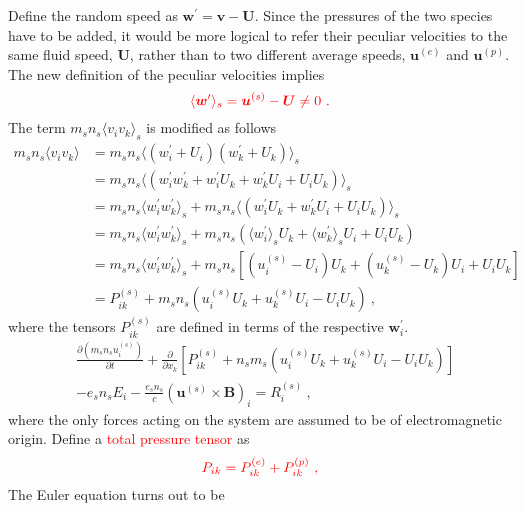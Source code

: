 \documentclass[12pt,a4paper]{article}
\renewcommand{\vec}[1]{\boldsymbol{#1}}
\begin{document}
Define the random speed as $\vec{w}^\prime = \vec{v} - \vec{U}$. Since the pressures of the two species have to be added, it would be more logical to refer their peculiar velocities to the same fluid speed, $\vec{U}$, rather than to two different average speeds, $\vec{u}^{(e)}$ and $\vec{u}^{(p)}$. The new definition of the peculiar velocities implies
\begin{equation*}
\color{red} \langle \vec{w}^\prime \rangle_s = \vec{u}^{(s)} - \vec{U} \neq 0 ~.
\end{equation*}
The term $m_s n_s \langle v_i v_k \rangle_s$ is modified as follows
\begin{align*}
m_s n_s \langle v_i v_k \rangle & = m_s n_s \langle (w_i^\prime +U_i)(w_k^\prime +U_k) \rangle_s \\
&  \boxed{= m_s n_s  \langle (w_i^\prime w_k^\prime +w_i^\prime U_k +w_k^\prime U_i +U_i U_k) \rangle_s }\\
&  \boxed{= m_s n_s  \langle w_i^\prime w_k^\prime \rangle_s +m_s n_s \langle (w_i^\prime U_k +w_k^\prime U_i +U_i U_k) \rangle_s }\\
&  \boxed{= m_s n_s  \langle w_i^\prime w_k^\prime \rangle_s +m_s n_s (\langle w_i^\prime \rangle_s U_k + \langle w_k^\prime \rangle_s U_i +U_i U_k ) }\\
& \boxed{= m_s n_s  \langle w_i^\prime w_k^\prime \rangle_s +m_s n_s \left[ \left(u^{(s)}_{i} -U_i \right)U_k +\left(u^{(s)}_{k} -U_k \right)U_i +U_iU_k \right] }\\
& = P^{(s)}_{ik} +m_s n_s \left(u^{(s)}_{i}U_k +u^{(s)}_{k} U_i -U_iU_k \right) ~,
\end{align*}
where the tensors $P^{(s)}_{ik}$ are defined in terms of the respective $\vec{w}_i^\prime$. 
\begin{align}
\nonumber & \frac{\partial (m_s n_s u_i^{(s)})}{\partial t} +\frac{\partial }{\partial x_k} \left[P^{(s)}_{ik} +n_s m_s \left(u_i^{(s)}U_k +u^{(s)}_{k} U_i -U_iU_k \right) \right] \\
& -e_s n_s E_i -\frac{e_s n_s}{c} \left(\vec{u}^{(s)} \times \vec{B} \right)_i = R^{(s)}_i ~,
\end{align}
where the only forces acting on the system are assumed to be of electromagnetic origin. Define a \textcolor{red}{total pressure tensor} as
\begin{equation*}
\color{red} P_{ik} = P^{(e)}_{ik} +P^{(p)}_{ik} ~,
\end{equation*}
The Euler equation turns out to be
\end{document}
